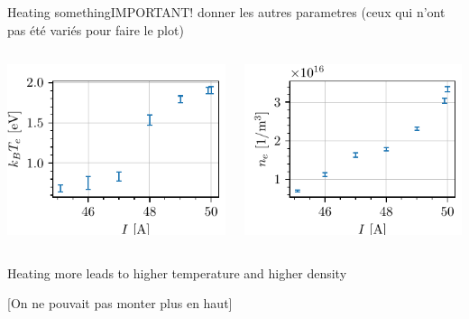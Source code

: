 \documentclass[10pt]{beamer}
\begin{document}
\begin{frame}{Heating something}{IMPORTANT! donner les autres parametres (ceux qui n'ont pas été variés pour faire le plot)}
    \begin{columns}
        \centering
        \includegraphics[scale=1]{../figures/temperatureeV_current.pdf}


        \centering
        \includegraphics[scale=1]{../figures/density_current.pdf}

    \end{columns}
    \vspace{0.5cm}
    Heating more leads to higher temperature and higher density

    [On ne pouvait pas monter plus en haut]
\end{frame}
\end{document}
